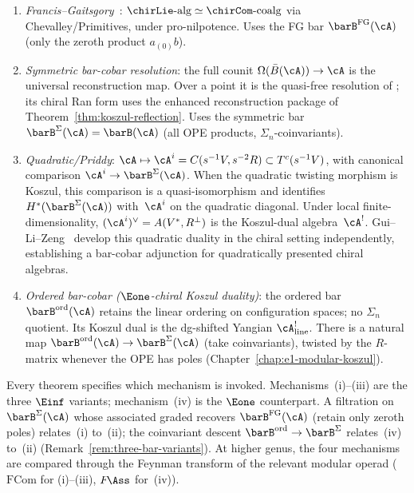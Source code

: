 \begin{remark}
\label{rem:three-koszul-mechanisms}
%
%
\begin{enumerate}[label=(\roman*)]
\item \emph{Francis--Gaitsgory}~\cite{FG12}:
 $\chirLie\text{-alg} \simeq \chirCom\text{-coalg}$ via
 Chevalley/Primitives, under pro-nilpotence.
 Uses the FG bar $\barB^{\mathrm{FG}}(\cA)$
 (only the zeroth product $a_{(0)}b$).
\item \emph{Symmetric bar-cobar resolution}: the full counit
 $\Omega(\bar{B}(\cA)) \to \cA$ is the universal reconstruction
 map. Over a point it is the quasi-free resolution of
 \cite[Corollary~2.3.4]{LV12}; its chiral Ran form uses the enhanced
 reconstruction package of Theorem~\ref{thm:koszul-reflection}.
 Uses the symmetric bar
 $\barB^{\Sigma}(\cA) = \barB(\cA)$ (all OPE products,
 $\Sigma_n$-coinvariants).
\item \emph{Quadratic/Priddy}:
 $\cA \mapsto \cA^i=C(s^{-1}V,s^{-2}R)\subset T^c(s^{-1}V)$, with canonical
 comparison $\cA^i\to\barB^{\Sigma}(\cA)$. When the quadratic
 twisting morphism is Koszul, this comparison is a quasi-isomorphism
 and identifies $H^*(\barB^{\Sigma}(\cA))$ with~$\cA^i$ on the
 quadratic diagonal. Under local finite-dimensionality,
 $(\cA^i)^\vee=A(V^*,R^\perp)$ is the Koszul-dual algebra~$\cA^!$.
 Gui--Li--Zeng~\cite{GLZ22} develop this quadratic duality
 in the chiral setting independently, establishing a
 bar-cobar adjunction for quadratically presented chiral
 algebras.
\item \emph{Ordered bar-cobar ($\Eone$-chiral Koszul duality)}:
 the ordered bar $\barB^{\mathrm{ord}}(\cA)$ retains the linear
 ordering on configuration spaces; no $\Sigma_n$ quotient.
 Its Koszul dual is the dg-shifted Yangian
 $\cA^!_{\mathrm{line}}$. There is a natural map
 $\barB^{\mathrm{ord}}(\cA) \to \barB^{\Sigma}(\cA)$
 (take coinvariants), twisted by the $R$-matrix whenever the
 OPE has poles
 (Chapter~\ref{chap:e1-modular-koszul}).
\end{enumerate}
Every theorem specifies which mechanism is invoked.
Mechanisms~(i)--(iii) are the three $\Einf$ variants;
mechanism~(iv) is the $\Eone$ counterpart.
A filtration on $\barB^{\Sigma}(\cA)$ whose associated
graded recovers $\barB^{\mathrm{FG}}(\cA)$ (retain only zeroth
poles) relates~(i) to~(ii); the coinvariant descent
$\barB^{\mathrm{ord}} \to \barB^{\Sigma}$ relates~(iv) to~(ii)
(Remark~\ref{rem:three-bar-variants}).
At higher genus, the four mechanisms are compared through the
Feynman transform of the relevant modular operad
($\mathrm{FCom}$ for (i)--(iii), $F\!\Ass$ for~(iv)).
\end{remark}

